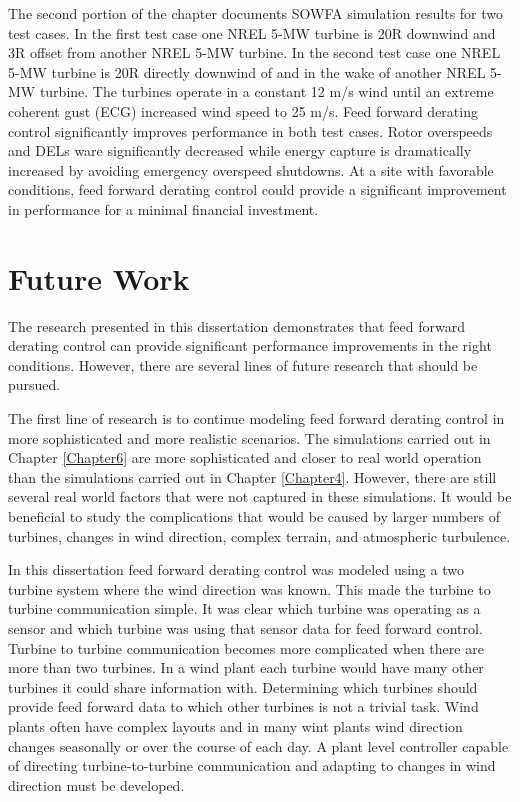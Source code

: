 The second portion of the chapter documents SOWFA simulation results for two test cases. In the first test case one NREL 5-MW turbine is 20R downwind and 3R offset from another NREL 5-MW turbine. In the second test case one NREL 5-MW turbine is 20R directly downwind of and in the wake of another NREL 5-MW turbine. The turbines operate in a constant 12 m/s wind until an extreme coherent gust (ECG) increased wind speed to 25 m/s. Feed forward derating control significantly improves performance in both test cases. Rotor overspeeds and DELs ware significantly decreased while energy capture is dramatically increased by avoiding emergency overspeed shutdowns.  At a site with favorable conditions, feed forward derating control could provide a significant improvement in performance for a minimal financial investment.








\section{Future Work}

The research presented in this dissertation demonstrates that feed forward derating control can provide significant performance improvements in the right conditions. However, there are several lines of future research that should be pursued. 

The first line of research is to continue modeling feed forward derating control in more sophisticated and more realistic scenarios. The simulations carried out in Chapter \ref{Chapter6} are more sophisticated and closer to real world operation than the simulations carried out in Chapter \ref{Chapter4}. However, there are still several real world factors that were not captured in these simulations. It would be beneficial  to study the complications that would be caused by larger numbers of turbines, changes in wind direction, complex terrain, and atmospheric turbulence.

In this dissertation feed forward derating control was modeled using a two turbine system where the wind direction was known. This made the turbine to turbine communication simple. It was clear which turbine was operating as a sensor and which turbine was using that sensor data for feed forward control. Turbine to turbine communication becomes more complicated when there are more than two turbines. In a wind plant each turbine would have many other turbines it could share information with. Determining which turbines should provide feed forward data to which other turbines is not a trivial task. Wind plants often have complex layouts and in many wint plants wind direction changes seasonally or over the course of each day. A plant level controller capable of directing turbine-to-turbine communication and adapting to changes in wind direction must be developed. 

